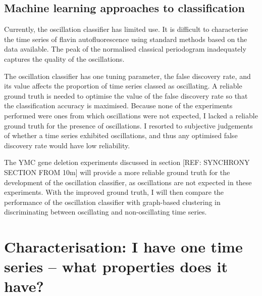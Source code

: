 \subsection{Machine learning approaches to classification}
\label{subsec:analysis-classification-ml}

Currently, the oscillation classifier has limited use.
It is difficult to characterise the time series of flavin autofluorescence using standard methods based on the data available.
The peak of the normalised classical periodogram inadequately captures the quality of the oscillations.

The oscillation classifier has one tuning parameter, the false discovery rate, and its value affects the proportion of time series classed as oscillating.
A reliable ground truth is needed to optimise the value of the false discovery rate so that the classification accuracy is maximised.
Because none of the experiments performed were ones from which oscillations were not expected, I lacked a reliable ground truth for the presence of oscillations.
I resorted to subjective judgements of whether a time series exhibited oscillations, and thus any optimised false discovery rate would have low reliability.

The YMC gene deletion experiments discussed in section [REF: SYNCHRONY SECTION FROM 10m] will provide a more reliable ground truth for the development of the oscillation classifier, as oscillations are not expected in these experiments.
With the improved ground truth, I will then compare the performance of the oscillation classifier with graph-based clustering in discriminating between oscillating and non-oscillating time series.

\section{Characterisation: I have one time series -- what properties does it have?}
\label{sec:analysis-characterisation}

